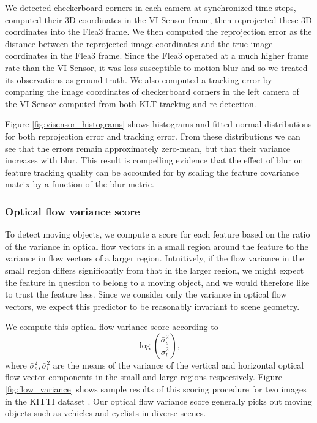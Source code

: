 \documentclass[letterpaper, 10 pt, conference]{ieeeconf}  %
\begin{document}
We detected checkerboard corners in each camera at synchronized time steps, computed their 3D coordinates in the VI-Sensor frame, then reprojected these 3D coordinates into the Flea3 frame.
We then computed the reprojection error as the distance between the reprojected image coordinates and the true image coordinates in the Flea3 frame.
Since the Flea3 operated at a much higher frame rate than the VI-Sensor, it was less susceptible to motion blur and so we treated its observations as ground truth.
We also computed a tracking error by comparing the image coordinates of checkerboard corners in the left camera of the VI-Sensor computed from both KLT tracking \cite{Lucas:1981uw} and re-detection.

Figure \ref{fig:visensor_histograms} shows histograms and fitted normal distributions for both reprojection error and tracking error.
From these distributions we can see that the errors remain approximately zero-mean, but that their variance increases with blur.
This result is compelling evidence that the effect of blur on feature tracking quality can be accounted for by scaling the feature covariance matrix by a function of the blur metric.


\subsubsection{Optical flow variance score}
To detect moving objects, we compute a score for each feature based on the ratio of the variance in optical flow vectors in a small region around the feature to the variance in flow vectors of a larger region.
Intuitively, if the flow variance in the small region differs significantly from that in the larger region, we might expect the feature in question to belong to a moving object, and we would therefore like to trust the feature less.
Since we consider only the variance in optical flow vectors, we expect this predictor to be reasonably invariant to scene geometry.

We compute this optical flow variance score according to
\begin{equation}
    \log \left( \frac{\bar{\sigma}^2_s}{\bar{\sigma}^2_l} \right),
\end{equation}
where $\bar{\sigma}^2_s, \bar{\sigma}^2_l$ are the means of the variance of the vertical and horizontal optical flow vector components in the small and large regions respectively.
Figure \ref{fig:flow_variance} shows sample results of this scoring procedure for two images in the KITTI dataset \cite{Geiger:2013kp}.
Our optical flow variance score generally picks out moving objects such as vehicles and cyclists in diverse scenes.
\end{document}
